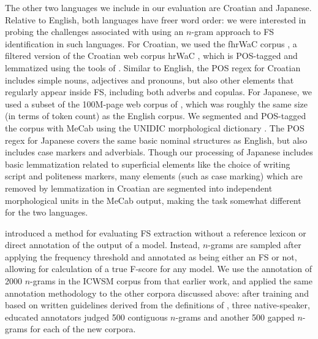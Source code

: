 \documentclass[11pt,letterpaper]{article}
\begin{document}
The other two languages we include in our evaluation are Croatian and Japanese. Relative to English, both languages have freer word order: we were interested in probing the challenges associated with using an $n$-gram approach to FS identification in such languages. For Croatian, we used the fhrWaC corpus \cite{snajder2013building}, a filtered version of the Croatian web corpus hrWaC \cite{ljubesic2014bs}, which is POS-tagged and lemmatized using the tools of . Similar to English, the POS regex for Croatian includes simple nouns, adjectives and pronouns, but also other elements that regularly appear inside FS, including both adverbs and copulas. For Japanese, we used a subset of the 100M-page web corpus of , which was roughly the same size (in terms of token count) as the English corpus. We segmented and POS-tagged the corpus with MeCab \cite{Kudo:2008} using the UNIDIC morphological dictionary \cite{Den:2007}. The POS regex for Japanese covers the same basic nominal structures as English, but also includes case markers and adverbials. Though our processing of Japanese includes basic lemmatization related to superficial elements like the choice of writing script and politeness markers, many elements (such as case marking) which are removed by lemmatization in Croatian are segmented into independent morphological units in the MeCab output, making the task somewhat different for the two languages.

 introduced a method for evaluating FS extraction without a reference lexicon or direct annotation of the output of a model. Instead, $n$-grams are sampled after applying the frequency threshold and annotated as being either an FS or not, allowing for calculation of a true F-score for any model. We use the annotation of 2000 $n$-grams in the ICWSM corpus from that earlier work, and applied the same annotation methodology to the other corpora discussed above: after training and based on written guidelines derived from the definitions of , three native-speaker, educated annotators judged 500 contiguous $n$-grams and another 500 gapped $n$-grams for each of the new corpora. 


\end{document}
